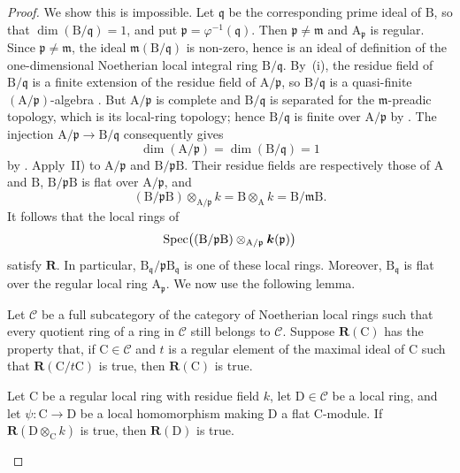 \begin{proof}
We show this is impossible. Let $\mathfrak{q}$ be the corresponding prime ideal of $\mathrm{B}$, so that $\dim(\mathrm{B}/\mathfrak{q})=1$, and put $\mathfrak{p}=\varphi^{-1}(\mathfrak{q})$. Then $\mathfrak{p}\neq\mathfrak{m}$ and $\mathrm{A}_\mathfrak{p}$ is regular. Since $\mathfrak{p}\neq\mathfrak{m}$, the ideal $\mathfrak{m}(\mathrm{B}/\mathfrak{q})$ is non-zero, hence is an ideal of definition of the one-dimensional Noetherian local integral ring $\mathrm{B}/\mathfrak{q}$. By~(i), the residue field of $\mathrm{B}/\mathfrak{q}$ is a finite extension of the residue field of $\mathrm{A}/\mathfrak{p}$, so $\mathrm{B}/\mathfrak{q}$ is a quasi-finite $(\mathrm{A}/\mathfrak{p})$-algebra . But $\mathrm{A}/\mathfrak{p}$ is complete and $\mathrm{B}/\mathfrak{q}$ is separated for the $\mathfrak{m}$-preadic topology, which is its local-ring topology; hence $\mathrm{B}/\mathfrak{q}$ is finite over $\mathrm{A}/\mathfrak{p}$ by . The injection $\mathrm{A}/\mathfrak{p}\to\mathrm{B}/\mathfrak{q}$ consequently gives
\[
  \dim(\mathrm{A}/\mathfrak{p})=\dim(\mathrm{B}/\mathfrak{q})=1
\]
by . Apply~II) to $\mathrm{A}/\mathfrak{p}$ and $\mathrm{B}/\mathfrak{p}\mathrm{B}$. Their residue fields are respectively those of $\mathrm{A}$ and $\mathrm{B}$, $\mathrm{B}/\mathfrak{p}\mathrm{B}$ is flat over $\mathrm{A}/\mathfrak{p}$, and
\[
 (\mathrm{B}/\mathfrak{p}\mathrm{B})\otimes_{\mathrm{A}/\mathfrak{p}}k
 =\mathrm{B}\otimes_\mathrm{A}k=\mathrm{B}/\mathfrak{m}\mathrm{B}.
\]
It follows that the local rings of
\[
 \operatorname{Spec}\bigl((\mathrm{B}/\mathfrak{p}\mathrm{B})\otimes_{\mathrm{A}/\mathfrak{p}}\boldsymbol{k}(\mathfrak{p})\bigr)
\]
satisfy $\boldsymbol{R}$. In particular, $\mathrm{B}_\mathfrak{q}/\mathfrak{p}\mathrm{B}_\mathfrak{q}$ is one of these local rings. Moreover, $\mathrm{B}_\mathfrak{q}$ is flat over the regular local ring $\mathrm{A}_\mathfrak{p}$. We now use the following lemma.

\begin{lemma}[7.5.1.1]
\label{IV.7.5.1.1}
Let $\mathcal{C}$ be a full subcategory of the category of Noetherian local rings such that every quotient ring of a ring in $\mathcal{C}$ still belongs to $\mathcal{C}$. Suppose $\boldsymbol{R}(\mathrm{C})$ has the property that, if $\mathrm{C}\in\mathcal{C}$ and $t$ is a regular element of the maximal ideal of $\mathrm{C}$ such that $\boldsymbol{R}(\mathrm{C}/t\mathrm{C})$ is true, then $\boldsymbol{R}(\mathrm{C})$ is true.

Let $\mathrm{C}$ be a regular local ring with residue field $k$, let $\mathrm{D}\in\mathcal{C}$ be a local ring, and let $\psi:\mathrm{C}\to\mathrm{D}$ be a local homomorphism making $\mathrm{D}$ a flat $\mathrm{C}$-module. If $\boldsymbol{R}(\mathrm{D}\otimes_\mathrm{C}k)$ is true, then $\boldsymbol{R}(\mathrm{D})$ is true.
\end{lemma}


\end{proof}
